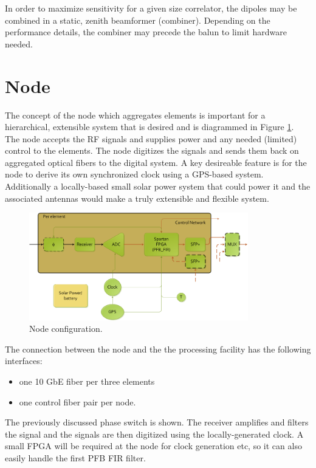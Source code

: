 \documentclass[11pt]{article}
\begin{document}
In order to maximize sensitivity for a given size correlator, the dipoles may be combined in a static, zenith beamformer (combiner).  Depending on the performance details, the combiner may precede the balun to limit hardware needed.

\section{Node}
The concept of the node which aggregates elements is important for a hierarchical, extensible system that is desired and is diagrammed in Figure \ref{fig:node}.  The node accepts the RF signals and supplies power and any needed (limited) control to the elements.  The node digitizes the signals and sends them back on aggregated optical fibers to the digital system.  A key desireable feature is for the node to derive its own synchronized clock using a GPS-based system.  Additionally a locally-based small solar power system that could power it and the associated antennas would make a truly extensible and flexible system.

\begin{figure}[h]
\centering
\includegraphics[width=0.85\textwidth]{plots/Node.png}
\caption{Node configuration.}
\label{fig:node}
\end{figure}

The connection between the node and the the processing facility has the following interfaces:
\begin{itemize}
\item one 10 GbE fiber per three elements
\item one control fiber pair per node.
\end{itemize}

The previously discussed phase switch is shown.  The receiver amplifies and filters the signal and the signals are then digitized using the locally-generated clock.  A small FPGA will be required at the node for clock generation etc, so it can also easily handle the first PFB FIR filter.
\end{document}
